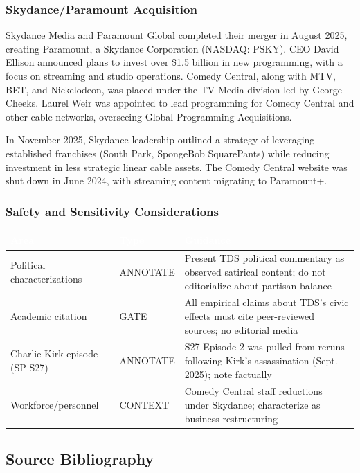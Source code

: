 \documentclass[11pt,letterpaper]{article}
\newcommand{\tableheader}[1]{\textbf{\sffamily\textcolor{white}{#1}}}
\begin{document}
\subsubsection{Skydance/Paramount Acquisition}

Skydance Media and Paramount Global completed their merger in August 2025, creating Paramount, a Skydance Corporation (NASDAQ: PSKY). CEO David Ellison announced plans to invest over \$1.5 billion in new programming, with a focus on streaming and studio operations. Comedy Central, along with MTV, BET, and Nickelodeon, was placed under the TV Media division led by George Cheeks. Laurel Weir was appointed to lead programming for Comedy Central and other cable networks, overseeing Global Programming Acquisitions.

In November 2025, Skydance leadership outlined a strategy of leveraging established franchises (South Park, SpongeBob SquarePants) while reducing investment in less strategic linear cable assets. The Comedy Central website was shut down in June 2024, with streaming content migrating to Paramount+.

\subsubsection{Safety and Sensitivity Considerations}

\begin{center}
\begin{tabularx}{\textwidth}{L{4cm}L{2.5cm}X}
\toprule
{}
\tableheader{Area} & \tableheader{Type} & \tableheader{Guidance} \\
\midrule
Political characterizations & ANNOTATE & Present TDS political commentary as observed satirical content; do not editorialize about partisan balance \\
Academic citation & GATE & All empirical claims about TDS's civic effects must cite peer-reviewed sources; no editorial media \\
Charlie Kirk episode (SP S27) & ANNOTATE & S27 Episode 2 was pulled from reruns following Kirk's assassination (Sept. 2025); note factually \\
Workforce/personnel & CONTEXT & Comedy Central staff reductions under Skydance; characterize as business restructuring \\
\bottomrule
\end{tabularx}
\end{center}

\subsection{Source Bibliography}
\end{document}
